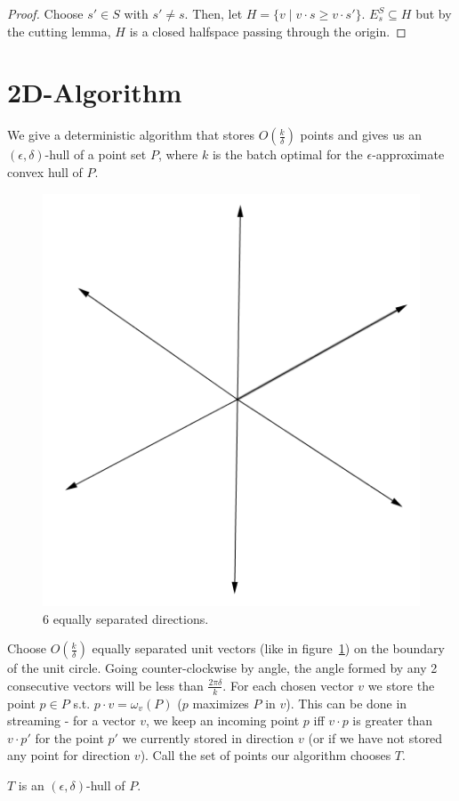 \begin{proof}
Choose $s' \in S$ with $s' \neq s$. Then, let $H = \{v \; | \; v \cdot s \geq v \cdot s'\}$. $E^S_s \subseteq H$ but by the cutting lemma, $H$ is a closed halfspace passing through the origin.
\end{proof}

\section{2D-Algorithm}

We give a deterministic algorithm that stores $O(\frac{k}{\delta})$ points and gives us an $(\epsilon, \delta)$-hull of a point set $P$, where $k$ is the batch optimal for the $\epsilon$-approximate convex hull of $P$.
\\

\begin{figure}[!htb]
\centering
\includegraphics[width=0.3\linewidth]{equally_spaced_directions}
\caption{6 equally separated directions.}
\label{fig:equally_spaced_directions}
\end{figure}

Choose $O(\frac{k}{\delta})$ equally separated unit vectors (like in figure~\ref{fig:equally_spaced_directions}) on the boundary of the unit circle. Going counter-clockwise by angle, the angle formed by any 2 consecutive vectors will be less than $\frac{2\pi\delta}{k}$. For each chosen vector $v$ we store the point $p \in P$ s.t. $p \cdot v = \omega_v(P)$ ($p$ maximizes $P$ in $v$). This can be done in streaming - for a vector $v$, we keep an incoming point $p$ iff $v \cdot p$ is greater than $v \cdot p'$ for the point $p'$ we currently stored in direction $v$ (or if we have not stored any point for direction $v$). Call the set of points our algorithm chooses $T$.

\begin{theorem}
$T$ is an $(\epsilon, \delta)$-hull of $P$.
\end{theorem}

